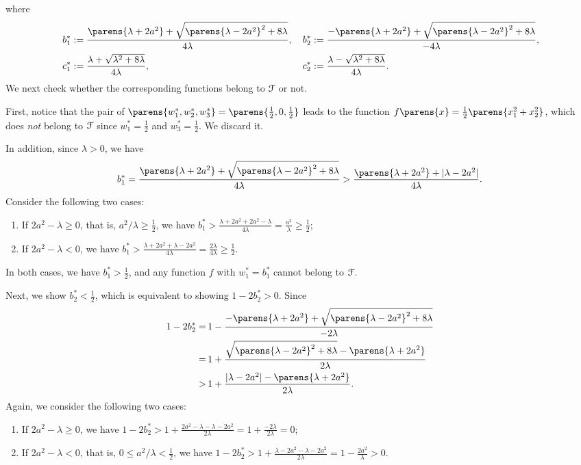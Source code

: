 	where 
	\begin{align*}
		& \, b_1^* := \frac{\parens{\lambda + 2 a^2} + \sqrt{\parens{\lambda - 2 a^2}^2 + 8 \lambda}}{4 \lambda}, 
		&& \, b_2^* := \frac{- \parens{\lambda + 2 a^2} + \sqrt{\parens{\lambda - 2 a^2}^2 + 8 \lambda}}{-4 \lambda}, \\ 
		& \, c_1^* := \frac{\lambda + \sqrt{\lambda^2 + 8 \lambda}}{4 \lambda}, 
		&& \, c_2^* := \frac{\lambda - \sqrt{\lambda^2 + 8 \lambda}}{4 \lambda}. 
	\end{align*}
	We next check whether the corresponding functions belong to $\mathcal{F}$ or not. 
	
	First, notice that the pair of $\parens{w_1^*, w_2^*, w_3^*} = \parens{\frac{1}{2}, 0, \frac{1}{2}}$ leads to the function $f \parens{x} = \frac{1}{2} \parens{x_1^2 + x_2^2}$, which does \textit{not} belong to $\mathcal{F}$ since $w_1^* = \frac{1}{2}$ and $w_3^* = \frac{1}{2}$. We discard it. 
	
	In addition, since $\lambda > 0$, we have 
	\begin{align*}
		b_1^* = \frac{\parens{\lambda + 2 a^2} + \sqrt{\parens{\lambda - 2 a^2}^2 + 8 \lambda}}{4 \lambda} > \frac{\parens{\lambda + 2 a^2} + \abs{\lambda - 2 a^2}}{4 \lambda}. 
	\end{align*}
	Consider the following two cases: 
	\begin{enumerate}
		\item[(i)] If $2 a^2 - \lambda \ge 0$, that is, $a^2/\lambda \ge \frac{1}{2}$, we have $b_1^* > \frac{\lambda + 2 a^2 + 2 a^2 - \lambda}{4 \lambda} = \frac{a^2}{\lambda} \ge \frac{1}{2}$; 

		\item[(ii)] If $2 a^2 - \lambda < 0$, we have $b_1^* > \frac{\lambda + 2 a^2 + \lambda - 2 a^2}{4 \lambda} = \frac{2\lambda}{4\lambda} \ge \frac{1}{2}$. 
	\end{enumerate}
	In both cases, we have $b_1^* > \frac{1}{2}$, and any function $f$ with $w_1^* = b_1^*$ cannot belong to $\mathcal{F}$. 
	
	Next, we show $b_2^* < \frac{1}{2}$, which is equivalent to showing $1 - 2b_2^* > 0$. Since 
	\begin{align*}
		1 - 2b_2^* = & \, 1 - \frac{- \parens{\lambda + 2 a^2} + \sqrt{\parens{\lambda - 2 a^2}^2 + 8 \lambda}}{-2 \lambda} \\ 
		= & \, 1 + \frac{\sqrt{\parens{\lambda - 2 a^2}^2 + 8 \lambda} - \parens{\lambda + 2 a^2}}{2 \lambda} \\ 
		> & \, 1 + \frac{\abs{\lambda - 2 a^2} - \parens{\lambda + 2 a^2}}{2 \lambda}. 
	\end{align*}
	Again, we consider the following two cases: 
	\begin{enumerate}
		\item[(i)] If $2 a^2 - \lambda \ge 0$, we have $1 - 2 b_2^* > 1 + \frac{2 a^2 - \lambda - \lambda - 2a^2}{2 \lambda} = 1 + \frac{- 2\lambda }{2 \lambda} = 0$; 
		\item[(ii)] If $2 a^2 - \lambda < 0$, that is, $0 \le a^2 / \lambda < \frac{1}{2}$, we have $1 - 2b_2^* > 1 + \frac{\lambda - 2 a^2 - \lambda - 2 a^2}{2 \lambda} = 1 - \frac{2 a^2}{\lambda} > 0$. 
	\end{enumerate}
	
